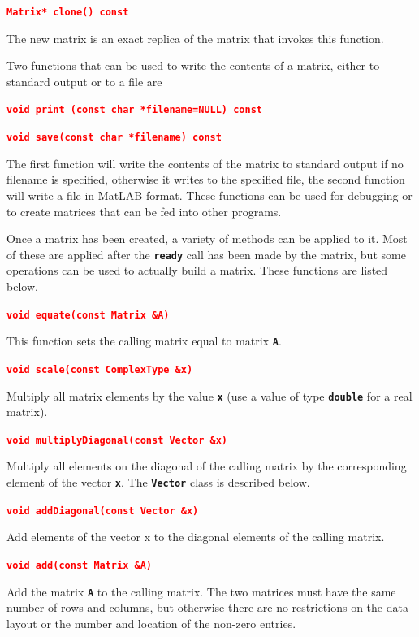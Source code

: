 \documentclass[12pt]{report} %
\begin{document}
\textcolor{red}{\texttt{\textbf{Matrix* clone() const}}}

The new matrix is an exact replica of the matrix that invokes this function.

Two functions that can be used to write the contents of a matrix, either to standard output or to a file are

\textcolor{red}{\texttt{\textbf{void print (const char *filename=NULL) const}}}

\textcolor{red}{\texttt{\textbf{void save(const char *filename) const}}}

The first function will write the contents of the matrix to standard output if no filename is specified, otherwise it writes to the specified file, the second function will write a file in MatLAB format. These functions can be used for debugging or to create matrices that can be fed into other programs.

Once a matrix has been created, a variety of methods can be applied to it. Most of these are applied after the \texttt{\textbf{ready}} call has been made by the matrix, but some operations can be used to actually build a matrix. These functions are listed below.

\textcolor{red}{\texttt{\textbf{void equate(const Matrix \&A)}}}

This function sets the calling matrix equal to matrix \texttt{\textbf{A}}.

\textcolor{red}{\texttt{\textbf{void scale(const ComplexType \&x)}}}

Multiply all matrix elements by the value \texttt{\textbf{x}} (use a value of type \texttt{\textbf{double}} for a real matrix).

\textcolor{red}{\texttt{\textbf{void multiplyDiagonal(const Vector \&x)}}}

Multiply all elements on the diagonal of the calling matrix by the corresponding element of the vector \texttt{\textbf{x}}. The \texttt{\textbf{Vector}} class is described below.

\textcolor{red}{\texttt{\textbf{void addDiagonal(const Vector \&x)}}}

Add elements of the vector x to the diagonal elements of the calling matrix.

\textcolor{red}{\texttt{\textbf{void add(const Matrix \&A)}}}

Add the matrix \texttt{\textbf{A}} to the calling matrix. The two matrices must have the same number of rows and columns, but otherwise there are no restrictions on the data layout or the number and location of the non-zero entries.
\end{document}
